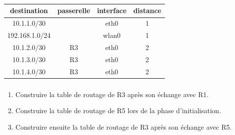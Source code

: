 \documentclass[svgnames,11pt]{beamer}
\begin{document}
\begin{frame}
    \frametitle{}

    \begin{center}
        \begin{tabular}{|*{4}{c|}}
            \hline
            destination    & passerelle & interface & distance \\
            \hline
            10.1.1.0/30    &            & eth0      & 1        \\
            \hline
            192.168.1.0/24 &            & wlan0     & 1        \\
            \hline
            10.1.2.0/30    & R3         & eth0      & 2        \\
            \hline
            10.1.3.0/30    & R3         & eth0      & 2        \\
            \hline
            10.1.4.0/30    & R3         & eth0      & 2        \\
            \hline
        \end{tabular}
    \end{center}
\end{frame}
\begin{frame}
    \frametitle{}

    \begin{activite}
        \begin{enumerate}
            \item Construire la table de routage de R3 après son échange avec R1.
            \item Construire la table de routage de R5 lors de la phase d'initialisation.
            \item Construire ensuite la table de routage de R3 après son échange avec R5.
        \end{enumerate}
    \end{activite}

\end{frame}
\end{document}
